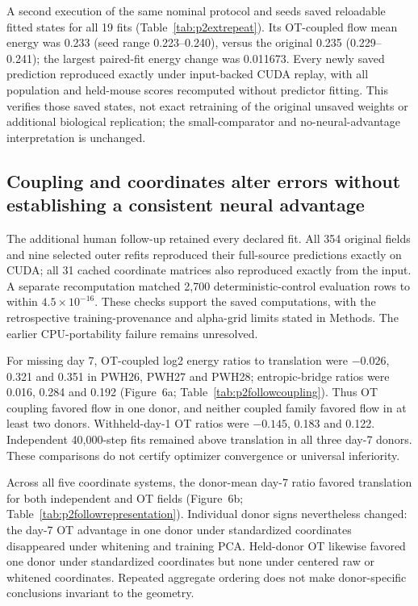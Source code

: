 \documentclass[10pt,a4paper]{article}
\begin{document}
A second execution of the same nominal protocol and seeds saved reloadable fitted states for all 19 fits (Table~\ref{tab:p2extrepeat}). Its OT-coupled flow mean energy was 0.233 (seed range 0.223--0.240), versus the original 0.235 (0.229--0.241); the largest paired-fit energy change was 0.011673. Every newly saved prediction reproduced exactly under input-backed CUDA replay, with all population and held-mouse scores recomputed without predictor fitting. This verifies those saved states, not exact retraining of the original unsaved weights or additional biological replication; the small-comparator and no-neural-advantage interpretation is unchanged.

\subsection{Coupling and coordinates alter errors without establishing a consistent neural advantage}
The additional human follow-up retained every declared fit. All 354 original fields and nine selected outer refits reproduced their full-source predictions exactly on CUDA; all 31 cached coordinate matrices also reproduced exactly from the input. A separate recomputation matched 2,700 deterministic-control evaluation rows to within $4.5\times10^{-16}$. These checks support the saved computations, with the retrospective training-provenance and alpha-grid limits stated in Methods. The earlier CPU-portability failure remains unresolved.

For missing day 7, OT-coupled log2 energy ratios to translation were $-0.026$, 0.321 and 0.351 in PWH26, PWH27 and PWH28; entropic-bridge ratios were 0.016, 0.284 and 0.192 (Figure~6a\label{call:p2f9}; Table~\ref{tab:p2followcoupling}). Thus OT coupling favored flow in one donor, and neither coupled family favored flow in at least two donors. Withheld-day-1 OT ratios were $-0.145$, 0.183 and 0.122. Independent 40,000-step fits remained above translation in all three day-7 donors. These comparisons do not certify optimizer convergence or universal inferiority.

Across all five coordinate systems, the donor-mean day-7 ratio favored translation for both independent and OT fields (Figure~6b; Table~\ref{tab:p2followrepresentation}). Individual donor signs nevertheless changed: the day-7 OT advantage in one donor under standardized coordinates disappeared under whitening and training PCA. Held-donor OT likewise favored one donor under standardized coordinates but none under centered raw or whitened coordinates. Repeated aggregate ordering does not make donor-specific conclusions invariant to the geometry.
\end{document}
